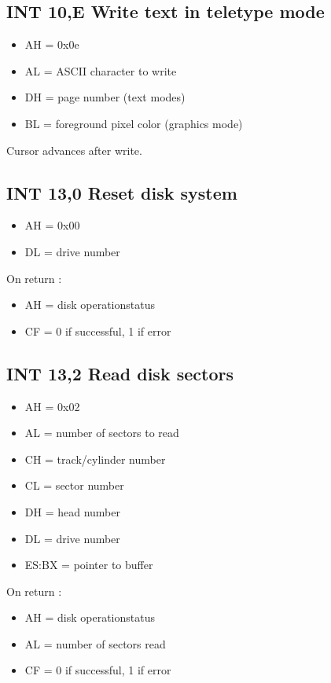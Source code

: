 \subsection{INT 10,E Write text in teletype mode}
\begin{itemize}
  \item{AH = 0x0e}
  \item{AL = ASCII character to write}
  \item{DH = page number (text modes)}
  \item{BL = foreground pixel color (graphics mode)}
\end{itemize}

Cursor advances after write.

%
%
\subsection{INT 13,0 Reset disk system}
\begin{itemize}
  \item{AH = 0x00}
  \item{DL = drive number}
\end{itemize}

On return :

\begin{itemize}
  \item{AH = disk operationstatus}
  \item{CF = 0 if successful, 1 if error}
\end{itemize}

\subsection{INT 13,2 Read disk sectors}
\begin{itemize}
  \item{AH = 0x02}
  \item{AL = number of sectors to read}
  \item{CH = track/cylinder number}
  \item{CL = sector number}
  \item{DH = head number}
  \item{DL = drive number}
  \item{ES:BX = pointer to buffer}
\end{itemize}

On return :

\begin{itemize}
  \item{AH = disk operationstatus}
  \item{AL = number of sectors read}
  \item{CF = 0 if successful, 1 if error}
\end{itemize}
%
%
